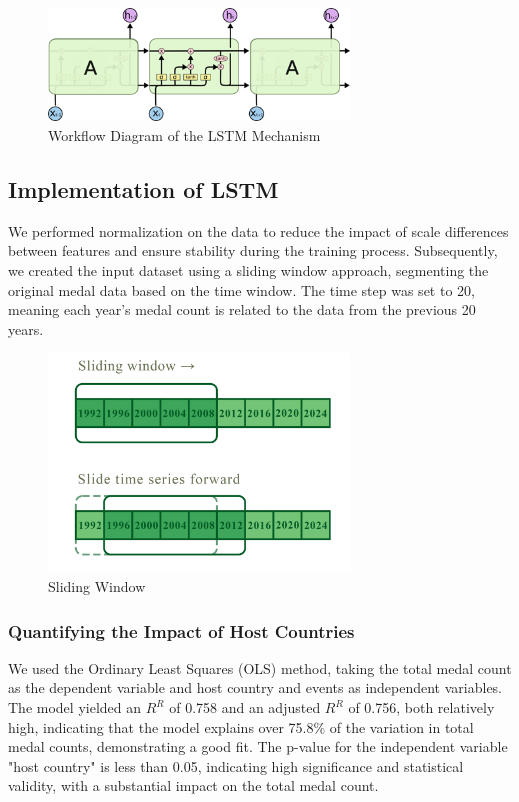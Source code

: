 \documentclass{mcmthesis}
\begin{document}
\begin{figure}[H]
    \centering
    \includegraphics[width=8cm]{graph/workflow.png}
    \caption{Workflow Diagram of the LSTM Mechanism} \label{Figure 4}
\end{figure}

\subsection{Implementation of LSTM}
We performed normalization on the data to reduce the impact of scale differences between features and ensure stability during the training process. Subsequently, we created the input dataset using a sliding window approach, segmenting the original medal data based on the time window. The time step was set to 20, meaning each year's medal count is related to the data from the previous 20 years.
\begin{figure}[H]
    \centering
    \includegraphics[width=8cm]{graph/sliding_window.png}
    \caption{Sliding Window} \label{Figure 4}
\end{figure}

\subsubsection{Quantifying the Impact of Host Countries}
We used the Ordinary Least Squares (OLS) method, taking the total medal count as the dependent variable and host country and events as independent variables. The model yielded an $R^{R}$ of 0.758 and an adjusted $R^{R}$ of 0.756, both relatively high, indicating that the model explains over 75.8\% of the variation in total medal counts, demonstrating a good fit. The p-value for the independent variable "host country" is less than 0.05, indicating high significance and statistical validity, with a substantial impact on the total medal count.
\end{document}

